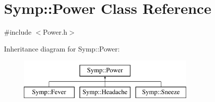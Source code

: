 \hypertarget{class_symp_1_1_power}{\section{Symp\-:\-:Power Class Reference}
\label{class_symp_1_1_power}
}


{\ttfamily \#include $<$Power.\-h$>$}

Inheritance diagram for Symp\-:\-:Power\-:\begin{figure}[H]
\begin{center}
\leavevmode
\includegraphics[height=2.000000cm]{class_symp_1_1_power}
\end{center}
\end{figure}
